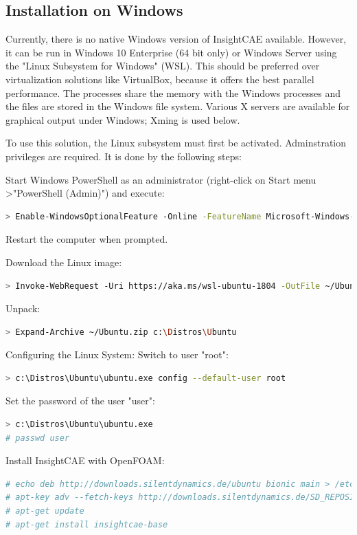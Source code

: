 \subsection{Installation on Windows}
Currently, there is no native Windows version of InsightCAE available.
However, it can be run in Windows 10 Enterprise (64 bit only) or Windows Server using the "Linux Subsystem for Windows" (WSL). This should be preferred over virtualization solutions like VirtualBox, because it offers the best parallel performance. The processes share the memory with the Windows processes and the files are stored in the Windows file system. Various X servers are available for graphical output under Windows; Xming is used below.

To use this solution, the Linux subsystem must first be activated. Adminstration privileges are required. It is done by the following steps:

Start Windows PowerShell as an administrator (right-click on Start menu \textgreater "PowerShell (Admin)") and execute:
\begin{lstlisting}[language=bash]
> Enable-WindowsOptionalFeature -Online -FeatureName Microsoft-Windows-Subsystem-Linux
\end{lstlisting}
Restart the computer when prompted.

Download the Linux image:
\begin{lstlisting}[language=bash]
> Invoke-WebRequest -Uri https://aka.ms/wsl-ubuntu-1804 -OutFile ~/Ubuntu.zip -UseBasicParsing
\end{lstlisting}

Unpack:
\begin{lstlisting}[language=bash]
> Expand-Archive ~/Ubuntu.zip c:\Distros\Ubuntu
\end{lstlisting}

Configuring the Linux System:
Switch to user "root":
\begin{lstlisting}[language=bash]
> c:\Distros\Ubuntu\ubuntu.exe config --default-user root
\end{lstlisting}

Set the password of the user "user":
\begin{lstlisting}[language=bash]
> c:\Distros\Ubuntu\ubuntu.exe
# passwd user
\end{lstlisting}

Install InsightCAE with OpenFOAM:

\begin{lstlisting}[language=bash]
# echo deb http://downloads.silentdynamics.de/ubuntu bionic main > /etc/apt/sources.list.d/sd.list
# apt-key adv --fetch-keys http://downloads.silentdynamics.de/SD_REPOSITORIES_PUBLIC_KEY.gpg
# apt-get update
# apt-get install insightcae-base
\end{lstlisting}

